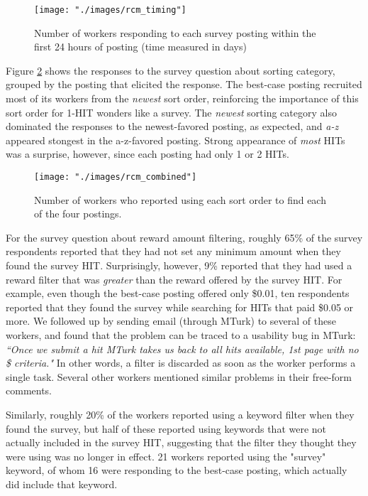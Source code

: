 \documentclass{sig-alternate}
\begin{document}
\begin{figure}[htp]
\centering
\texttt{[image: "./images/rcm\_timing"]}
\caption{Number of workers responding to each survey posting within the first 24 hours of posting (time measured in days)}
\label{fig:X2}
\end{figure}

Figure \ref{fig:X3} shows the responses to the survey question about
sorting category, grouped by the posting that elicited the response.
The best-case posting recruited most of its workers from the {\em
  newest} sort order, reinforcing the importance of this sort order
for 1-HIT wonders like a survey.  The {\em newest} sorting category
also dominated the responses to the newest-favored posting, as
expected, and {\em a-z} appeared stongest in the a-z-favored posting.
Strong appearance of {\em most} HITs was a surprise, however, since
each posting had only 1 or 2 HITs.


\begin{figure}[htp]
\centering
\texttt{[image: "./images/rcm\_combined"]}
\caption{Number of workers who reported using each sort order to find
  each of the four postings.}
\label{fig:X3}
\end{figure}

For the survey question about reward amount filtering, roughly 65\% of
the survey respondents reported that they had not set any minimum
amount when they found the survey HIT.  Surprisingly, however, 9\%
reported that they had used a reward filter that was {\em greater}
than the reward offered by the survey HIT.  For example, even though
the best-case posting offered only \$0.01, ten respondents reported
that they found the survey while searching for HITs that paid \$0.05
or more.  We followed up by sending email (through MTurk) to several
of these workers, and found that the problem can be traced to a
usability bug in MTurk: {\em ``Once we submit a hit MTurk takes us
  back to all hits available, 1st page with no \$ criteria."}  In
other words, a filter is discarded as soon as the worker performs a
single task.  Several other workers mentioned similar problems in
their free-form comments.

Similarly, roughly 20\% of the workers reported using a keyword filter
when they found the survey, but half of these reported using keywords
that were not actually included in the survey HIT, suggesting that the
filter they thought they were using was no longer in effect.  21
workers reported using the "survey" keyword, of whom 16 were
responding to the best-case posting, which actually did include that
keyword.
\end{document}
